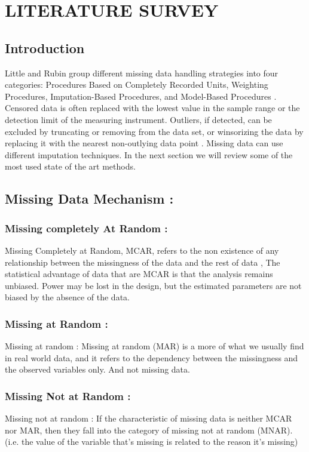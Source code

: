 

\chapter{LITERATURE SURVEY} \label{chapter1}

\section{Introduction}

Little and Rubin \cite{Little2002} group different missing data handling strategies into four categories: Procedures Based on Completely Recorded Units, Weighting Procedures, Imputation-Based Procedures, and Model-Based Procedures \cite{Little2002}. Censored data is often replaced with the lowest value in the sample range or the detection limit of the measuring instrument.
Outliers, if detected, can be excluded by truncating or removing from the data set, or winsorizing the data by replacing it with the nearest non-outlying data point \cite{Hastings1947}. Missing data can use different imputation techniques. In the next section we will review some of the most used state of the art methods.


\section{ Missing Data Mechanism :} 

\subsection{Missing 
completely At Random :}

Missing Completely at Random, MCAR,  refers to the non existence of any relationship between the missingness of the data and the rest of data , The statistical advantage of data that are MCAR is that the analysis remains unbiased. Power may be lost in the design, but the estimated parameters are not biased by the absence of the data.
\subsection{Missing at Random :}
Missing at random : Missing at random (MAR) is a more of what we usually find in real world data,  and it refers to the dependency between the missingness and the observed variables only. And not missing data.
\subsection{Missing Not at Random :}
Missing not at random : If the characteristic  of missing data  is neither MCAR nor MAR, then they fall into the category of missing not at random (MNAR). (i.e. the value of the variable that's missing is related to the reason it's missing)

